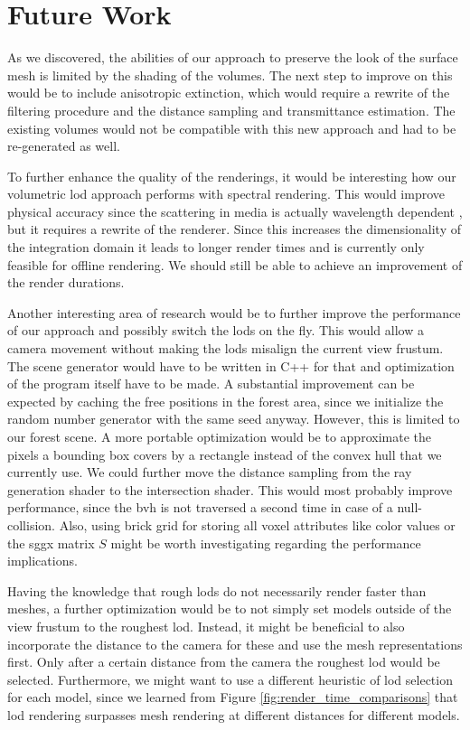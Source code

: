 \chapter{Future Work}
\label{chap:future_work}
As we discovered, the abilities of our approach to preserve the look of the surface mesh is limited by the shading of the volumes.
The next step to improve on this would be to include anisotropic extinction, which would require a rewrite of the filtering procedure and the distance sampling and transmittance estimation.
The existing volumes would not be compatible with this new approach and had to be re-generated as well.

To further enhance the quality of the renderings, it would be interesting how our volumetric \ac{lod} approach performs with spectral rendering.
This would improve physical accuracy since the scattering in media is actually wavelength dependent \cite{novak_overview}, but it requires a rewrite of the renderer.
Since this increases the dimensionality of the integration domain it leads to longer render times and is currently only feasible for offline rendering.
We should still be able to achieve an improvement of the render durations.

Another interesting area of research would be to further improve the performance of our approach and possibly switch the \acsp{lod} on the fly.
This would allow a camera movement without making the \acsp{lod} misalign the current view frustum.
The scene generator would have to be written in C++ for that and optimization of the program itself have to be made.
A substantial improvement can be expected by caching the free positions in the forest area, since we initialize the random number generator with the same seed anyway.
However, this is limited to our forest scene.
A more portable optimization would be to approximate the pixels a bounding box covers by a rectangle instead of the convex hull that we currently use.
We could further move the distance sampling from the ray generation shader to the intersection shader.
This would most probably improve performance, since the \ac{bvh} is not traversed a second time in case of a null-collision.
Also, using brick grid for storing all voxel attributes like color values or the \ac{sggx} matrix $S$ might be worth investigating regarding the performance implications.

Having the knowledge that rough \acsp{lod} do not necessarily render faster than meshes, a further optimization would be to not simply set models outside of the view frustum to the roughest \ac{lod}.
Instead, it might be beneficial to also incorporate the distance to the camera for these and use the mesh representations first.
Only after a certain distance from the camera the roughest \ac{lod} would be selected.
Furthermore, we might want to use a different heuristic of \ac{lod} selection for each model, since we learned from Figure \ref{fig:render_time_comparisons} that \ac{lod} rendering surpasses mesh rendering at different distances for different models.